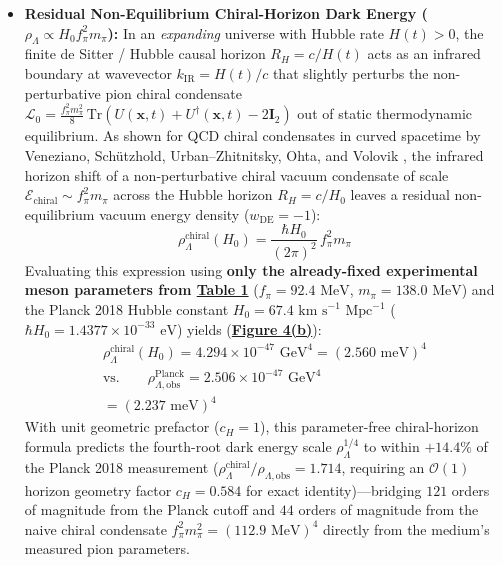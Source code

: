 \documentclass[10pt,aps,prd,twocolumn,superscriptaddress,nofootinbib,floatfix,longbibliography,showkeys]{revtex4-2}
\begin{document}
\begin{itemize}
  \item \textbf{Residual Non-Equilibrium Chiral-Horizon Dark Energy ($\rho_\Lambda \propto H_0 f_\pi^2 m_\pi$):} In an \textit{expanding} universe with Hubble rate $H(t) > 0$, the finite de Sitter / Hubble causal horizon $R_H = c / H(t)$ acts as an infrared boundary at wavevector $k_{\text{IR}} = H(t)/c$ that slightly perturbs the non-perturbative pion chiral condensate $\mathcal{L}_0 = \frac{f_\pi^2 m_\pi^2}{8}\,\text{Tr}(U(\mathbf{x}, t) + U^\dagger(\mathbf{x}, t) - 2\mathbf{I}_2)$ out of static thermodynamic equilibrium. As shown for QCD chiral condensates in curved spacetime by Veneziano, Sch\"utzhold, Urban--Zhitnitsky, Ohta, and Volovik \cite{ref15,ref16,ref25,ref26,ref30,ref31,ref32}, the infrared horizon shift of a non-perturbative chiral vacuum condensate of scale $\mathcal{E}_{\text{chiral}} \sim f_\pi^2 m_\pi$ across the Hubble horizon $R_H = c/H_0$ leaves a residual non-equilibrium vacuum energy density ($w_{\text{DE}} = -1$):
\begin{equation}
\rho_\Lambda^{\text{chiral}}(H_0) = \frac{\hbar H_0}{(2\pi)^2}\,f_\pi^2 m_\pi
\end{equation}
  Evaluating this expression using \textbf{only the already-fixed experimental meson parameters from \hyperref[tab:table1]{Table 1}} ($f_\pi = 92.4\text{ MeV}$, $m_\pi = 138.0\text{ MeV}$) and the Planck 2018 Hubble constant $H_0 = 67.4\text{ km s}^{-1}\text{ Mpc}^{-1}$ ($\hbar H_0 = 1.4377 \times 10^{-33}\text{ eV}$) \cite{ref28,ref29} yields (\textbf{\hyperref[fig:fig4]{Figure 4(b)}}):
\begin{equation}\begin{gathered}
\rho_\Lambda^{\text{chiral}}(H_0) = 4.294 \times 10^{-47}\text{ GeV}^4 = \left(2.560\text{ meV}\right)^4 \\
\text{vs.} \qquad \rho_{\Lambda,\text{obs}}^{\text{Planck}} = 2.506 \times 10^{-47}\text{ GeV}^4 \\
= \left(2.237\text{ meV}\right)^4
\end{gathered}\end{equation}
  With unit geometric prefactor ($c_H = 1$), this parameter-free chiral-horizon formula predicts the fourth-root dark energy scale $\rho_\Lambda^{1/4}$ to within \textbf{$+14.4\%$} of the Planck 2018 measurement ($\rho_\Lambda^{\text{chiral}} / \rho_{\Lambda,\text{obs}} = 1.714$, requiring an $\mathcal{O}(1)$ horizon geometry factor $c_H = 0.584$ for exact identity)---bridging $121$ orders of magnitude from the Planck cutoff and $44$ orders of magnitude from the naive chiral condensate $f_\pi^2 m_\pi^2 = (112.9\text{ MeV})^4$ directly from the medium's measured pion parameters.

\end{itemize}
\end{document}
